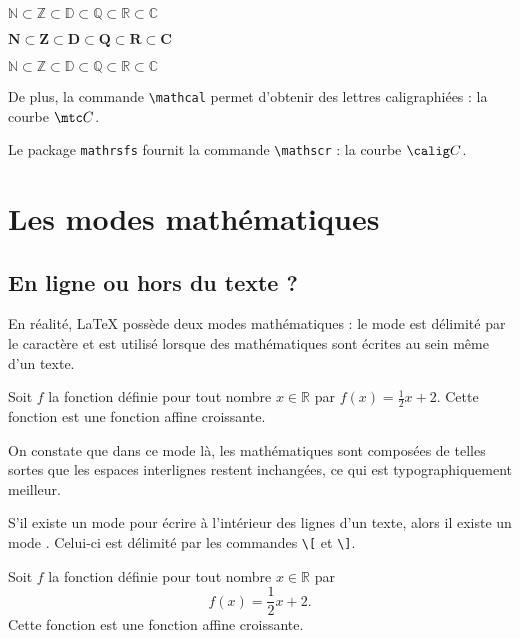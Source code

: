 {
\begin{SideBySideExample}
    $\mathbb N \subset \mathbb Z \subset \mathbb D
    \subset \mathbb Q\subset \mathbb R \subset \mathbb C$

    $\mathbf N \subset \mathbf Z \subset \mathbf D
    \subset \mathbf Q\subset \mathbf R \subset \mathbf C$

    $\mathds N \subset \mathds Z \subset \mathds D
    \subset \mathds Q\subset \mathds R \subset \mathds C$
\end{SideBySideExample}
}
\bigskip

De plus, la commande \texttt{\textbackslash mathcal} permet d'obtenir des lettres caligraphiées : la courbe $\mtc C$.

Le package \texttt{mathrsfs} fournit la commande \texttt{\textbackslash mathscr} : la courbe $\calig C$.

\section{Les modes mathématiques}
\subsection{En ligne ou hors du texte ?}

En réalité, \LaTeX{} possède deux modes mathématiques : le mode  est délimité par le caractère \ordi{\$} et est utilisé lorsque des mathématiques sont écrites au sein même d'un texte.\bigskip

{
\begin{SideBySideExample}
    Soit $f$ la fonction d\'efinie pour tout nombre
    $x \in \mathds R$ par $f(x) = \frac 12 x + 2$.
    Cette fonction est une fonction affine croissante.
\end{SideBySideExample}
}\bigskip

On constate que dans ce mode là, les mathématiques sont composées de telles sortes que les espaces interlignes restent inchangées, ce qui est typographiquement meilleur.\medskip

S'il existe un mode  pour écrire à l'intérieur des lignes d'un texte, alors il existe un mode . Celui-ci est délimité par les commandes \verb!\[! et \verb!\]!.\bigskip

{
\begin{SideBySideExample}
    Soit $f$ la fonction d\'efinie pour tout nombre
    $x \in \mathds R$ par \[f(x) = \frac 12 x + 2.\]
    Cette fonction est une fonction affine croissante.
\end{SideBySideExample}
}\bigskip

